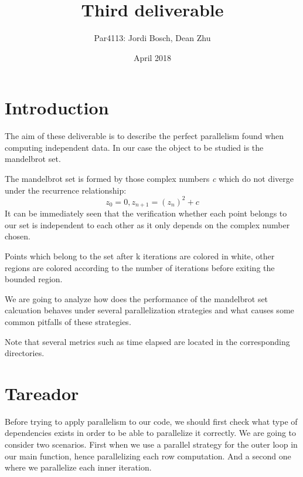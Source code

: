 \documentclass[11pt]{article}
\title{Third deliverable}
\date{April 2018}
\author{Par4113: Jordi Bosch, Dean Zhu}
\begin{document}
\maketitle

\tableofcontents
\newpage

\section{Introduction}
The aim of these deliverable is to describe the perfect parallelism found when computing independent data. In our case the object to be studied is the mandelbrot set.

The mandelbrot set is formed by those complex numbers \emph{c} which do not diverge under the recurrence relationship: \[ z_0 = 0, z_{n+1}=(z_n)^{2} + c \]
It can be immediately seen that the verification whether each point belongs to our set is independent to each other as it only depends on the complex number chosen.

Points which belong to the set after k iterations are colored in white, other regions are colored according to the number of iterations before exiting the bounded region.

We are going to analyze how does the performance of the mandelbrot set calcuation behaves under several parallelization strategies and what causes some common pitfalls of these strategies.

Note that several metrics such as time elapsed are located in the corresponding directories.
\section{Tareador}

Before trying to apply parallelism to our code, we should first check what type of dependencies exists in order to be able to parallelize it correctly. We are going to consider two scenarios. First when we use a parallel strategy for the outer loop in our main function, hence parallelizing each row computation. And a second one where we parallelize each inner iteration.
\end{document}
